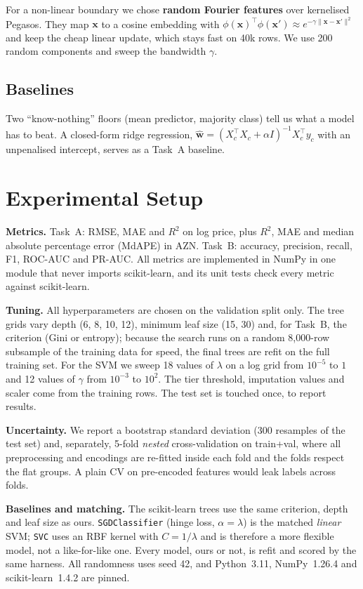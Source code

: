 \documentclass[10pt,twocolumn,a4paper]{article}
\begin{document}
For a non-linear boundary we chose \textbf{random Fourier features} over
kernelised Pegasos. They map $\mathbf{x}$ to a cosine embedding with
$\phi(\mathbf{x})^{\top}\phi(\mathbf{x}')\approx e^{-\gamma\lVert\mathbf{x}-\mathbf{x}'\rVert^2}$
and keep the cheap linear update, which stays fast on 40k rows. We use 200
random components and sweep the bandwidth $\gamma$.

\subsection{Baselines}
Two ``know-nothing'' floors (mean predictor, majority class) tell us what a
model has to beat. A closed-form ridge regression,
$\hat{\mathbf{w}}=(X_c^{\top}X_c+\alpha I)^{-1}X_c^{\top}y_c$ with an
unpenalised intercept, serves as a Task~A baseline.

\section{Experimental Setup}
\textbf{Metrics.} Task~A: RMSE, MAE and $R^2$ on log price, plus $R^2$,
MAE and median absolute percentage error (MdAPE) in AZN. Task~B: accuracy,
precision, recall, F1, ROC-AUC and PR-AUC. All metrics are implemented in
NumPy in one module that never imports scikit-learn, and its unit tests
check every metric against scikit-learn.

\textbf{Tuning.} All hyperparameters are chosen on the validation split only.
The tree grids vary depth (6, 8, 10, 12), minimum leaf size (15, 30) and, for
Task~B, the criterion (Gini or entropy); because the search runs on a random
8{,}000-row subsample of the training data for speed, the final trees are
refit on the full training set. For the SVM we sweep 18 values of $\lambda$ on
a log grid from $10^{-5}$ to $1$ and 12 values of $\gamma$ from $10^{-3}$ to $10^{2}$.
The tier threshold, imputation values and scaler come from the training
rows. The test set is touched once, to report results.

\textbf{Uncertainty.} We report a bootstrap standard deviation (300
resamples of the test set) and, separately, 5-fold \emph{nested} cross-validation
on train+val, where all preprocessing and encodings are re-fitted inside each
fold and the folds respect the flat groups. A plain CV on pre-encoded features
would leak labels across folds.

\textbf{Baselines and matching.} The scikit-learn trees use the same criterion,
depth and leaf size as ours. \texttt{SGDClassifier} (hinge loss, $\alpha=\lambda$)
is the matched \emph{linear} SVM; \texttt{SVC} uses an RBF kernel with
$C=1/\lambda$ and is therefore a more flexible model, not a like-for-like
one. Every model, ours or not, is refit and scored by the same
harness. All randomness uses seed 42, and Python~3.11, NumPy~1.26.4 and
scikit-learn~1.4.2 are pinned.
\end{document}
